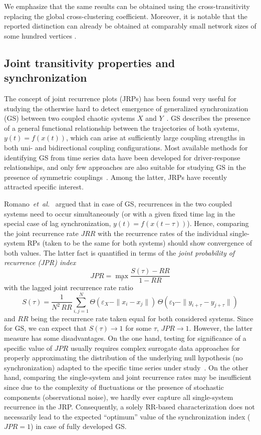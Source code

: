 \documentclass[graybox]{svmult}
\begin{document}
We emphasize that the same results can be obtained using the cross-transitivity replacing the global cross-clustering coefficient. Moreover, it is notable that the reported distinction can already be obtained at comparably small network sizes of some hundred vertices \cite{Feldhoff2012}.


\subsection{Joint transitivity properties and synchronization}\label{sec:sync}

The concept of joint recurrence plots (JRPs) has been found very useful for studying the otherwise hard to detect emergence of generalized synchronization (GS) between two coupled chaotic systems $X$ and $Y$~\cite{Romano2005EPL}. GS describes the presence of a general functional relationship between the trajectories of both systems, $y(t)=f(x(t))$, which can arise at sufficiently large coupling strengths in both uni- and bidirectional coupling configurations. Most available methods for identifying GS from time series data have been developed for driver-response relationships, and only few approaches are also suitable for studying GS in the presence of symmetric couplings~\cite{Feldhoff2013}. Among the latter, JRPs have recently attracted specific interest.

Romano~\textit{et~al.}~\cite{Romano2005EPL} argued that in case of GS, recurrences in the two coupled systems need to occur simultaneously (or with a given fixed time lag in the special case of lag synchronization, $y(t)=f(x(t-\tau))$). Hence, comparing the joint recurrence rate $JRR$ with the recurrence rates of the individual single-system RPs (taken to be the same for both systems) should show convergence of both values. The latter fact is quantified in terms of the \textit{joint probability of recurrence (JPR) index}
\begin{equation}
JPR = \max_{\tau} \frac{S(\tau)-RR}{1-RR}
\label{eq:jpr}
\end{equation}
\noindent
with the lagged joint recurrence rate ratio
\begin{equation}
S(\tau)=\frac{1}{N^2\, RR}\sum_{i,j=1}^N \Theta(\varepsilon_X-\|x_i-x_j\|)\, \Theta(\varepsilon_Y-\|y_{i+\tau}-y_{j+\tau}\|)
\end{equation}
\noindent
and $RR$ being the recurrence rate taken equal for both considered systems. Since for GS, we can expect that $S(\tau)\to 1$ for some $\tau$, $JPR\to 1$. However, the latter measure has some disadvantages. On the one hand, testing for significance of a specific value of $JPR$ usually requires complex surrogate data approaches for properly approximating the distribution of the underlying null hypothesis (no synchronization) adapted to the specific time series under study~\cite{Thiel2006}. On the other hand, comparing the single-system and joint recurrence rates may be insufficient since due to the complexity of fluctuations or the presence of stochastic components (observational noise), we hardly ever capture all single-system recurrence in the JRP. Consequently, a solely RR-based characterization does not necessarily lead to the expected ``optimum'' value of the synchronization index ($JPR=1$) in case of fully developed GS.
\end{document}
